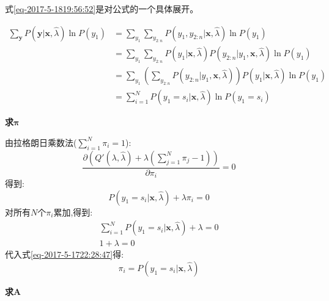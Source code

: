 \documentclass[UTF8,a4paper]{ctexart}%
\begin{document}
            {\color{blue}
            式\eqref{eq-2017-5-1819:56:52}是对公式的一个具体展开。

            \begin{equation}
              \begin{split}
              \sum_{\bm{y}} P(\bm{y}|\bm{x},\hat{\lambda}) \ln P(y_1) &= \sum_{y_1} \sum_{y_{2:n}}
              P(y_1, y_{2:n}|\bm{x},\hat{\lambda}) \ln P(y_1) \\
              &= \sum_{y_1} \sum_{y_{2:n}}
              P(y_1|\bm{x},\hat{\lambda})P(y_{2:n}|y_1,\bm{x},\hat{\lambda}) \ln P(y_1)\\
              &= \sum_{y_1}
              \left ( \sum_{y_{2:n}} P(y_{2:n}|y_1,\bm{x},\hat{\lambda}) \right ) P(y_1|\bm{x},\hat{\lambda}) \ln P(y_1) \\
              &= \sum_{i = 1}^N  P(y_1 = s_i|\bm{x},\hat{\lambda}) \ln P(y_1 = s_i)
            \end{split}
            \end{equation}
            }


            \textbf{求$\bm{\pi}$}

            由拉格朗日乘数法($\sum_{i= 1}^N \pi_i = 1$):
            \begin{equation}
              \frac{\partial\left( Q'(\lambda,\hat{\lambda}) + \lambda\left( \sum_{j = 1}^N \pi_j - 1\right) \right)}{\partial \pi_i} = 0
            \end{equation}
            得到:
            \begin{equation}
              P(y_1 = s_i|\bm{x},\hat{\lambda}) + \lambda \pi_i = 0
              \label{eq-2017-5-1722:28:47}
            \end{equation}
            对所有$N$个$\pi_i$累加,得到:
            \begin{equation}
              \begin{split}
              \sum_{i = 1}^N P(y_1 = s_i|\bm{x},\hat{\lambda}) + \lambda = 0\\
              1 + \lambda = 0
              \end{split}
            \end{equation}
            代入式\eqref{eq-2017-5-1722:28:47}得:
            \begin{equation}
              \pi_i = P(y_1 = s_i|\bm{x},\hat{\lambda})
            \end{equation}

            \textbf{求$\bm{A}$}
\end{document}
